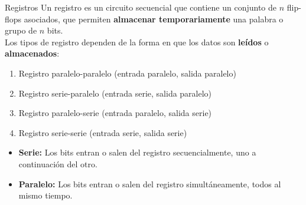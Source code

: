 \documentclass[aspectratio=169]{beamer}
\begin{document}
\begin{frame}[c]{Registros}
    Un registro es un circuito secuencial que contiene un conjunto de $n$ flip-flops asociados, que permiten \textbf{almacenar temporariamente} una palabra o grupo de $n$ bits.\\
    \vspace{0.2cm}
    \pause
    Los tipos de registro dependen de la forma en que los datos son \textbf{le\'idos} o \textbf{almacenados}:
    \vspace{0.2cm}
    \begin{enumerate}
    \item Registro \textcolor{naranjauca}{paralelo-paralelo} {\scriptsize (entrada paralelo, salida paralelo)}
    \item Registro \textcolor{naranjauca}{serie-paralelo} {\scriptsize (entrada serie, salida paralelo)}
    \item Registro \textcolor{naranjauca}{paralelo-serie} {\scriptsize (entrada paralelo, salida serie)}
    \item Registro \textcolor{naranjauca}{serie-serie} {\scriptsize (entrada serie, salida serie)}
    \end{enumerate}
    \bigskip
    \small
    \begin{itemize}
     \item[] \textbf{Serie:} \textcolor{verdeuca}{Los bits entran o salen del registro secuencialmente, uno a continuación del otro.}
     \item[] \textbf{Paralelo:} \textcolor{verdeuca}{Los bits entran o salen del registro simultáneamente, todos al mismo tiempo.}
    \end{itemize}
\end{frame}

\end{document}
